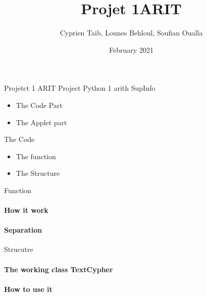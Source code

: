 \documentclass{beamer}
\title{Projet 1ARIT}
\author{Cyprien Taib, Lounes Behloul, Soufian Oualla}
\date{February 2021}
\begin{document}
    \begin{frame}{Projetct 1 ARIT}
        \Large Project Python 1 arith SupInfo
        \begin{center}
            \small{
                \begin{itemize}
                    \item The Code Part 
                    \item The Applet part 
                \end{itemize}
            }
        \end{center}
	\end{frame}
    
    \begin{frame}{The Code }
        \begin{center}
            \small{
                \begin{itemize}
                    \item The function 
                    \item The Structure
                \end{itemize}
            }
        \end{center}

    \end{frame}

    \begin{frame}{Function}
        \paragraph{How it work}
        
        \paragraph{Separation}
        
    \end{frame}

    \begin{frame}{Strucutre}
        \paragraph{The working class TextCypher}
        \paragraph{How to use it}
    \end{frame}
\end{document}
